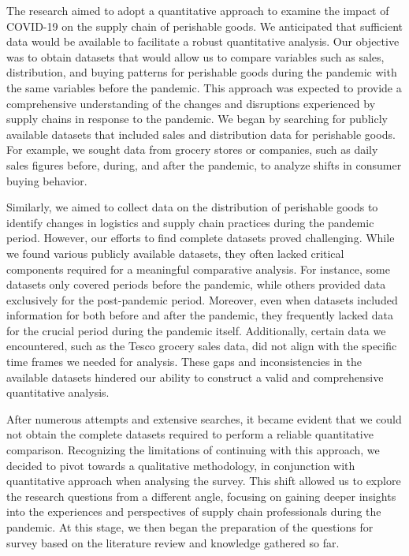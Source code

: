 The research aimed to adopt a quantitative approach to examine the impact of COVID-19 on the supply chain of perishable goods. We anticipated that sufficient data would be available to facilitate a robust quantitative analysis. Our objective was to obtain datasets that would allow us to compare variables such as sales, distribution, and buying patterns for perishable goods during the pandemic with the same variables before the pandemic. This approach was expected to provide a comprehensive understanding of the changes and disruptions experienced by supply chains in response to the pandemic. We began by searching for publicly available datasets that included sales and distribution data for perishable goods. For example, we sought data from grocery stores or companies, such as daily sales figures before, during, and after the pandemic, to analyze shifts in consumer buying behavior. 

Similarly, we aimed to collect data on the distribution of perishable goods to identify changes in logistics and supply chain practices during the pandemic period. However, our efforts to find complete datasets proved challenging. While we found various publicly available datasets, they often lacked critical components required for a meaningful comparative analysis. For instance, some datasets only covered periods before the pandemic, while others provided data exclusively for the post-pandemic period. Moreover, even when datasets included information for both before and after the pandemic, they frequently lacked data for the crucial period during the pandemic itself. Additionally, certain data we encountered, such as the Tesco grocery sales data, did not align with the specific time frames we needed for analysis. These gaps and inconsistencies in the available datasets hindered our ability to construct a valid and comprehensive quantitative analysis.

After numerous attempts and extensive searches, it became evident that we could not obtain the complete datasets required to perform a reliable quantitative comparison. Recognizing the limitations of continuing with this approach, we decided to pivot towards a qualitative methodology, in conjunction with quantitative approach when analysing the survey. This shift allowed us to explore the research questions from a different angle, focusing on gaining deeper insights into the experiences and perspectives of supply chain professionals during the pandemic. At this stage, we then began the preparation of the questions for survey based on the literature review and knowledge gathered so far.

